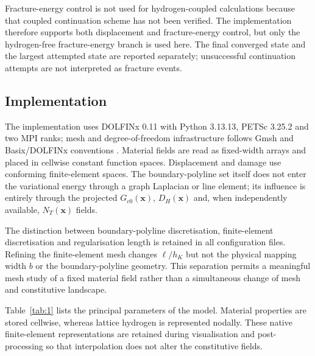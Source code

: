 \documentclass[preprint,12pt]{elsarticle}
\begin{document}
Fracture-energy control is not used for hydrogen-coupled calculations because
that coupled continuation scheme has not been verified. The implementation
therefore supports both displacement and fracture-energy control, but only the
hydrogen-free fracture-energy branch is used here. The final converged state and
the largest attempted state are reported separately; unsuccessful continuation
attempts are not interpreted as fracture events.
\subsection{Implementation}

The implementation uses DOLFINx 0.11 with Python 3.13.13, PETSc 3.25.2 and two MPI ranks; mesh and degree-of-freedom infrastructure follows Gmsh and Basix/DOLFINx conventions \cite{geuzaine2009,scroggs2022,balay2024}. Material fields are read as fixed-width arrays and placed in cellwise constant function spaces. Displacement and damage use conforming finite-element spaces. The boundary-polyline set itself does not enter the variational energy through a graph Laplacian or line element; its influence is entirely through the projected \(G_{c0}(\mathbf{x})\), \(D_H(\mathbf{x})\) and, when independently available, \(N_T(\mathbf{x})\) fields.

The distinction between boundary-polyline discretisation, finite-element discretisation and regularisation length is retained in all configuration files. Refining the finite-element mesh changes \(\ell/h_K\) but not the physical mapping width \(b\) or the boundary-polyline geometry. This separation permits a meaningful mesh study of a fixed material field rather than a simultaneous change of mesh and constitutive landscape.

Table~\ref{tab:1} lists the principal parameters of the model.
Material properties are stored cellwise, whereas lattice hydrogen is represented
nodally. These native finite-element representations are retained during
visualisation and post-processing so that interpolation does not alter the
constitutive fields.
\end{document}
